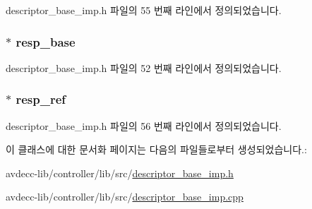 descriptor\+\_\+base\+\_\+imp.\+h 파일의 55 번째 라인에서 정의되었습니다.

\subsubsection[{\texorpdfstring{resp\+\_\+base}{resp_base}}]{$\ast$ resp\+\_\+base\hspace{0.3cm}{\ttfamily [protected]}}\hypertarget{classavdecc__lib_1_1descriptor__base__imp_a8b104da8319cda946944548ebb9552f4}{}\label{classavdecc__lib_1_1descriptor__base__imp_a8b104da8319cda946944548ebb9552f4}


descriptor\+\_\+base\+\_\+imp.\+h 파일의 52 번째 라인에서 정의되었습니다.

\subsubsection[{\texorpdfstring{resp\+\_\+ref}{resp_ref}}]{$\ast$ resp\+\_\+ref\hspace{0.3cm}{\ttfamily [protected]}}\hypertarget{classavdecc__lib_1_1descriptor__base__imp_a2642e3a7c10d38553e7ff4a55e875346}{}\label{classavdecc__lib_1_1descriptor__base__imp_a2642e3a7c10d38553e7ff4a55e875346}


descriptor\+\_\+base\+\_\+imp.\+h 파일의 56 번째 라인에서 정의되었습니다.



이 클래스에 대한 문서화 페이지는 다음의 파일들로부터 생성되었습니다.\+:\begin{DoxyCompactItemize}
\item 
avdecc-\/lib/controller/lib/src/\hyperlink{descriptor__base__imp_8h}{descriptor\+\_\+base\+\_\+imp.\+h}\item 
avdecc-\/lib/controller/lib/src/\hyperlink{descriptor__base__imp_8cpp}{descriptor\+\_\+base\+\_\+imp.\+cpp}\end{DoxyCompactItemize}
